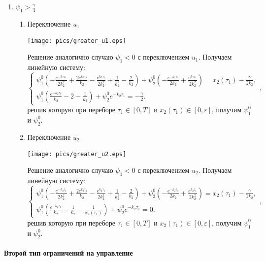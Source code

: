 \documentclass[11pt]{article}
\begin{document}
\begin{enumerate}
\item $\psi_1 > \tfrac{\gamma}{4}$
\begin{enumerate}
\item Переключение $u_1$

\texttt{[image: pics/greater\_u1.eps]}

Решение аналогично случаю $\psi_1 < 0$ с переключением $u_1$. Получаем линейную систему:
$$
\left\{
\begin{aligned}
\psi_1^0 \left( -\frac{e^{-k_2 \tau_1}}{2k_2^2} + \frac{2e^{k_2 \tau_1}}{k_2} - \frac{e^{k_2 \tau_1}}{2k_2^2} + \frac{1}{k_2^2} - \frac{2}{k_2}\right) + \psi_2^0 \left( -\frac{e^{-k_2 \tau_1}}{2k_2} + \frac{e^{k_2 \tau_1}}{2k_2^2} \right)  = x_2(\tau_1) - \frac{\gamma}{2k_2}, \\
\psi_1^0 \left( \frac{e^{-k_2\tau_1}}{k_2} - 2 - \frac{1}{k_2} \right) + \psi_2^0 e^{-k_2\tau_1} = -\frac{\gamma}{2}.
\end{aligned}
\right.,
$$
решив которую при переборе $\tau_1 \in [0, T]$ и $x_2(\tau_1) \in [0, \varepsilon]$, получим $\psi_1^0$ и $\psi_2^0$.

\item Переключение $u_2$

\texttt{[image: pics/greater\_u2.eps]}

Решение аналогично случаю $\psi_1 < 0$ с переключением $u_2$. Получаем линейную систему:
$$
\left\{
\begin{aligned}
\psi_1^0 \left( -\frac{e^{-k_2 \tau_1}}{2k_2^2} + \frac{2e^{k_2 \tau_1}}{k_2} - \frac{e^{k_2 \tau_1}}{2k_2^2} + \frac{1}{k_2^2} - \frac{2}{k_2}\right) + \psi_2^0 \left( -\frac{e^{-k_2 \tau_1}}{2k_2} + \frac{e^{k_2 \tau_1}}{2k_2^2} \right)  = x_2(\tau_1) - \frac{\gamma}{2k_2}, \\
\psi_1^0 \left( \frac{e^{-k_2\tau_1}}{k_2} - \frac{1}{k_2} - \frac{1}{x_2(\tau_1)} \right) + \psi_2^0 e^{-k_2\tau_1} = 0.
\end{aligned}
\right.,
$$
решив которую при переборе $\tau_1 \in [0, T]$ и $x_2(\tau_1) \in [0, \varepsilon]$, получим $\psi_1^0$ и $\psi_2^0$.

\end{enumerate}
\end{enumerate}

\paragraph{Второй тип ограничений на управление}
\end{document}
